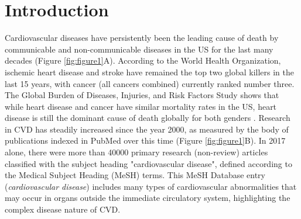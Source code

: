 \documentclass[letter]{bioinfo}
\begin{document}
\maketitle
	
\section*{Introduction}
	
Cardiovascular diseases have persistently been the leading cause of death by communicable and non-communicable diseases in the US for the last many decades (Figure \ref{fig:figure1}A).  According to the World Health Organization, ischemic heart disease and stroke have remained the top two global killers in the last 15 years, with cancer (all cancers combined) currently ranked number three. The Global Burden of Diseases, Injuries, and Risk Factors Study shows that while heart disease and cancer have similar mortality rates in the US, heart disease is still the dominant cause of death globally for both genders \citep{Roth:2018:Global}.  Research in CVD has steadily increased since the year 2000, as measured by the body of publications indexed in PubMed over this time (Figure \ref{fig:figure1}B).  In 2017 alone, there were more than 40000 primary research (non-review) articles classified with the subject heading "cardiovascular disease", defined according to the Medical Subject Heading (MeSH) terms.  This MeSH Database entry (\textit{cardiovascular disease}) includes many types of cardiovascular abnormalities that may occur in organs outside the immediate circulatory system, highlighting the complex disease nature of CVD.
\end{document}
